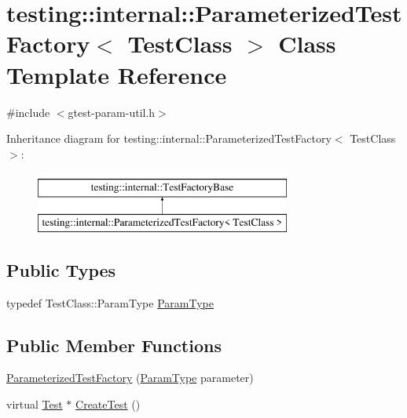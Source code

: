 \hypertarget{classtesting_1_1internal_1_1ParameterizedTestFactory}{}\section{testing\+::internal\+::Parameterized\+Test\+Factory$<$ Test\+Class $>$ Class Template Reference}
\label{classtesting_1_1internal_1_1ParameterizedTestFactory}


{\ttfamily \#include $<$gtest-\/param-\/util.\+h$>$}

Inheritance diagram for testing\+::internal\+::Parameterized\+Test\+Factory$<$ Test\+Class $>$\+:\begin{figure}[H]
\begin{center}
\leavevmode
\includegraphics[height=2.000000cm]{classtesting_1_1internal_1_1ParameterizedTestFactory}
\end{center}
\end{figure}
\subsection*{Public Types}
\begin{DoxyCompactItemize}
\item 
typedef Test\+Class\+::\+Param\+Type \mbox{\hyperlink{classtesting_1_1internal_1_1ParameterizedTestFactory_ad9a27b8e1a83de2f1687625bccff460d}{Param\+Type}}
\end{DoxyCompactItemize}
\subsection*{Public Member Functions}
\begin{DoxyCompactItemize}
\item 
\mbox{\hyperlink{classtesting_1_1internal_1_1ParameterizedTestFactory_a82d78356cd402224255edec760a048fb}{Parameterized\+Test\+Factory}} (\mbox{\hyperlink{classtesting_1_1internal_1_1ParameterizedTestFactory_ad9a27b8e1a83de2f1687625bccff460d}{Param\+Type}} parameter)
\item 
virtual \mbox{\hyperlink{classtesting_1_1Test}{Test}} $\ast$ \mbox{\hyperlink{classtesting_1_1internal_1_1ParameterizedTestFactory_ae17e73e91f7fd5d49ca238c005ef4960}{Create\+Test}} ()
\end{DoxyCompactItemize}
